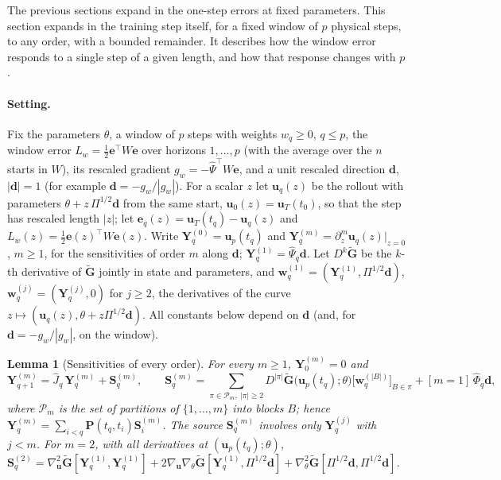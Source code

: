 \documentclass[11pt]{article}
\newtheorem{lemma}{Lemma}
\theoremstyle{definition}
\theoremstyle{remark}
\newcommand{\uu}{\mathbf{u}}
\newcommand{\ee}{\mathbf{e}}
\newcommand{\Gt}{\tilde{\mathbf{G}}}
\newcommand{\Ph}{\hat{\mathbf P}}
\newcommand{\Phih}{\hat\Phi}
\newcommand{\Psih}{\hat\Psi}
\begin{document}
The previous sections expand in the one-step errors at fixed parameters.
This section expands in the training step itself, for a fixed window of $p$ physical steps, to any order, with a bounded remainder.
It describes how the window error responds to a single step of a given length, and how that response changes with $p$.

\paragraph{Setting.}
Fix the parameters $\theta$, a window of $p$ steps with weights $w_q\ge0$, $q\le p$, the window error $L_w=\tfrac12\ee^\top W\ee$ over horizons $1,\dots,p$ (with the average over the $n$ starts in $W$), its rescaled gradient $g_w=-\Psih^\top W\ee$, and a unit rescaled direction $\mathbf d$, $|\mathbf d|=1$ (for example $\mathbf d=-g_w/|g_w|$).
For a scalar $z$ let $\uu_q(z)$ be the rollout with parameters $\theta+z\,\Pi^{1/2}\mathbf d$ from the same start, $\uu_0(z)=\uu_T(t_0)$, so that the step has rescaled length $|z|$; let $\ee_q(z)=\uu_T(t_q)-\uu_q(z)$ and $L_w(z)=\tfrac12\ee(z)^\top W\ee(z)$.
Write $\mathbf Y^{(0)}_q=\uu_p(t_q)$ and $\mathbf Y^{(m)}_q=\partial_z^m\uu_q(z)|_{z=0}$, $m\ge1$, for the sensitivities of order $m$ along $\mathbf d$; $\mathbf Y^{(1)}_q=\Psih_q\mathbf d$.
Let $D^k\Gt$ be the $k$-th derivative of $\Gt$ jointly in state and parameters, and $\mathbf w^{(1)}_q=(\mathbf Y^{(1)}_q,\Pi^{1/2}\mathbf d)$, $\mathbf w^{(j)}_q=(\mathbf Y^{(j)}_q,0)$ for $j\ge2$, the derivatives of the curve $z\mapsto(\uu_q(z),\theta+z\Pi^{1/2}\mathbf d)$.
All constants below depend on $\mathbf d$ (and, for $\mathbf d=-g_w/|g_w|$, on the window).

\begin{lemma}[Sensitivities of every order]\label{lem:sens}
For every $m\ge1$, $\mathbf Y^{(m)}_0=0$ and
\[
\mathbf Y^{(m)}_{q+1}=\hat J_q\,\mathbf Y^{(m)}_q+\mathbf S^{(m)}_q,\qquad
\mathbf S^{(m)}_q=\sum_{\pi\in\mathcal P_m,\ |\pi|\ge2}D^{|\pi|}\Gt\big(\uu_p(t_q);\theta\big)\big[\mathbf w^{(|B|)}_q\big]_{B\in\pi}+[m=1]\,\Phih_q\mathbf d,
\]
where $\mathcal P_m$ is the set of partitions of $\{1,\dots,m\}$ into blocks $B$; hence $\mathbf Y^{(m)}_q=\sum_{i<q}\Ph(t_q,t_i)\mathbf S^{(m)}_i$.
The source $\mathbf S^{(m)}_q$ involves only $\mathbf Y^{(j)}_q$ with $j<m$.
For $m=2$, with all derivatives at $(\uu_p(t_q);\theta)$, $\mathbf S^{(2)}_q=\nabla^2_\uu\Gt[\mathbf Y^{(1)}_q,\mathbf Y^{(1)}_q]+2\nabla_\uu\nabla_\theta\Gt[\mathbf Y^{(1)}_q,\Pi^{1/2}\mathbf d]+\nabla^2_\theta\Gt[\Pi^{1/2}\mathbf d,\Pi^{1/2}\mathbf d]$.
\end{lemma}
\end{document}

